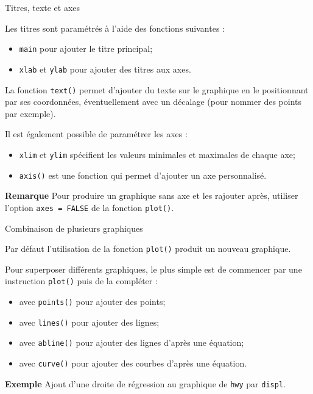 \documentclass[12pt,handout,ignorenonframetext,]{beamer}
\providecommand{\tightlist}{%
\setlength{\itemsep}{0pt}\setlength{\parskip}{0pt}}
\begin{document}
\begin{frame}[fragile]{Titres, texte et axes}

Les titres sont paramétrés à l'aide des fonctions suivantes :

\vspace{-0.3cm}

\begin{itemize}
\tightlist
\item
  \texttt{main} pour ajouter le titre principal;
\item
  \texttt{xlab} et \texttt{ylab} pour ajouter des titres aux axes.
\end{itemize}

\pause La fonction \texttt{text()} permet d'ajouter du texte sur le
graphique en le positionnant par ses coordonnées, éventuellement avec un
décalage (pour nommer des points par exemple).

\pause Il est également possible de paramétrer les axes :

\vspace{-0.3cm}

\begin{itemize}
\tightlist
\item
  \texttt{xlim} et \texttt{ylim} spécifient les valeurs minimales et
  maximales de chaque axe;
\item
  \texttt{axis()} est une fonction qui permet d'ajouter un axe
  personnalisé.
\end{itemize}

\pause 

\textbf{Remarque} Pour produire un graphique sans axe et les rajouter
après, utiliser l'option \texttt{axes\ =\ FALSE} de la fonction
\texttt{plot()}.

\end{frame}

\begin{frame}[fragile]{Combinaison de plusieurs graphiques}

Par défaut l'utilisation de la fonction \texttt{plot()} produit un
nouveau graphique.

\pause Pour superposer différents graphiques, le plus simple est de
commencer par une instruction \texttt{plot()} puis de la compléter :

\begin{itemize}
\tightlist
\item
  avec \texttt{points()} pour ajouter des points;
\item
  avec \texttt{lines()} pour ajouter des lignes;
\item
  avec \texttt{abline()} pour ajouter des lignes d'après une équation;
\item
  avec \texttt{curve()} pour ajouter des courbes d'après une équation.
\end{itemize}

\pause 

\textbf{Exemple} Ajout d'une droite de régression au graphique de
\texttt{hwy} par \texttt{displ}.

\end{frame}
\end{document}
